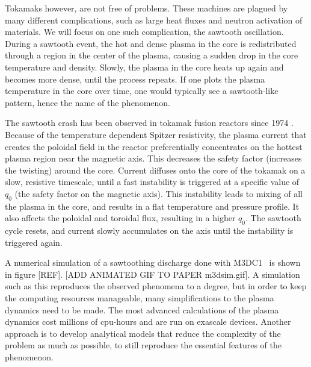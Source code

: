 \documentclass[%
superscriptaddress,
amsmath,amssymb,
aps,
pre,
floatfix,
]{revtex4-2}
\begin{document}
Tokamaks however, are not free of problems. These machines are plagued by many different complications, such as large heat fluxes and neutron activation of materials. We will focus on one such complication, the sawtooth oscillation. During a sawtooth event, the hot and dense plasma in the core is redistributed through a region in the center of the plasma, causing a sudden drop in the core temperature and density. Slowly, the plasma in the core heats up again and becomes more dense, until the process repeats. If one plots the plasma temperature in the core over time, one would typically see a sawtooth-like pattern, hence the name of the phenomenon.

The sawtooth crash has been observed in tokamak fusion reactors since 1974 \cite{von1974studies, vershkov1974role}.
Because of the temperature dependent Spitzer resistivity, the plasma current that creates the poloidal field in the reactor preferentially concentrates on the hottest plasma region near the magnetic axis.
This decreases the safety factor (increases the twisting) around the core.
Current diffuses onto the core of the tokamak on a slow, resistive timescale, until a fast instability is triggered at a specific value of $q_0$ (the safety factor on the magnetic axis).
This instability leads to mixing of all the plasma in the core, and results in a flat temperature and pressure profile.
It also affects the poloidal and toroidal flux, resulting in a higher $q_0$.
The sawtooth cycle resets, and current slowly accumulates on the axis until the instability is triggered again.

A numerical simulation of a sawtoothing discharge done with M3DC1~\cite{jardin2012multiple} is shown in figure [REF]. [ADD ANIMATED GIF TO PAPER m3dsim.gif]. 
A simulation such as this reproduces the observed phenomena to a degree, but in order to keep the computing resources manageable, many simplifications to the plasma dynamics need to be made. 
The most advanced calculations of the plasma dynamics cost millions of cpu-hours and are run on exascale devices. 
Another approach is to develop analytical models that reduce the complexity of the problem as much as possible, to still reproduce the essential features of the phenomenon. 
\end{document}
